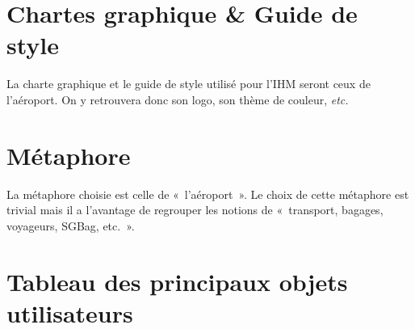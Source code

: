 \section{Chartes graphique \& Guide de style}
La charte graphique et le guide de style utilisé pour l'IHM seront ceux de
l'aéroport. On y retrouvera donc son logo, son thème de couleur, \textsl{etc.}

\section{Métaphore}
La métaphore choisie est celle de «~l'aéroport~». Le choix de cette métaphore
est trivial mais il a l'avantage de regrouper les notions de «~transport,
    bagages, voyageurs, SGBag, etc.~».

\section{Tableau des principaux objets utilisateurs}
\providecommand{\DJSPU}[1]{}

